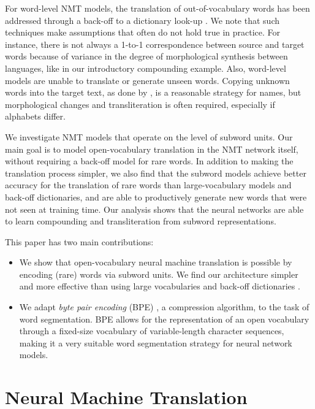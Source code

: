 For word-level NMT models, the translation of out-of-vocabulary words has been addressed through a back-off to a dictionary look-up \cite{jean15,DBLP:journals/corr/LuongSLVZ14}. We note that such techniques make assumptions that often do not hold true in practice. For instance, there is not always a 1-to-1 correspondence between source and target words because of variance in the degree of morphological synthesis between languages, like in our introductory compounding example. Also, word-level models are unable to translate or generate unseen words. Copying unknown words into the target text, as done by \cite{jean15,DBLP:journals/corr/LuongSLVZ14}, is a reasonable strategy for names, but morphological changes and transliteration is often required, especially if alphabets differ.

We investigate NMT models that operate on the level of subword units. Our main goal is to model open-vocabulary translation in the NMT network itself, without requiring a back-off model for rare words. In addition to making the translation process simpler, we also find that the subword models achieve better accuracy for the translation of rare words than large-vocabulary models and back-off dictionaries, and are able to productively generate new words that were not seen at training time. Our analysis shows that the neural networks are able to learn compounding and transliteration from subword representations.

This paper has two main contributions:

\begin{itemize}

\item We show that open-vocabulary neural machine translation is possible by encoding (rare) words via subword units. We find our architecture simpler and more effective than using large vocabularies and back-off dictionaries \cite{jean15,DBLP:journals/corr/LuongSLVZ14}.

\item We adapt \emph{byte pair encoding} (BPE) \cite{Gage:1994:NAD:177910.177914}, a compression algorithm, to the task of word segmentation. BPE allows for the representation of an open vocabulary through a fixed-size vocabulary of variable-length character sequences, making it a very suitable word segmentation strategy for neural network models.

\end{itemize}

\section{Neural Machine Translation}

